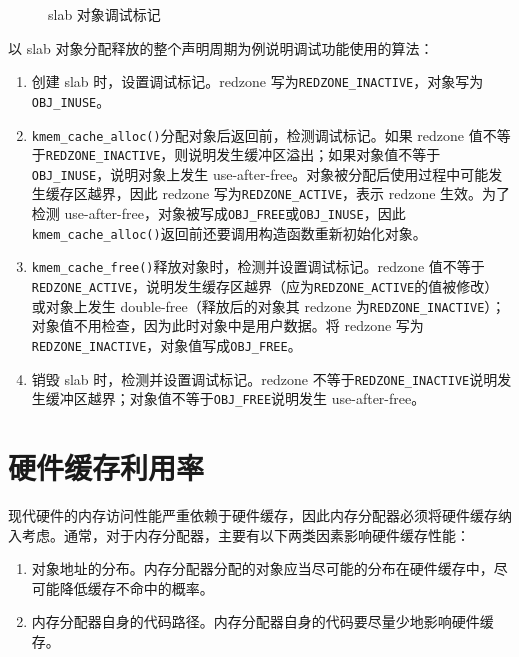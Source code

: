 \documentclass[AutoFakeBold]{LZUThesis}
\begin{document}
\begin{sloppypar}
\begin{figure}
\centering

\caption{slab 对象调试标记}
\label{figure:slab-obj-debug-mark}
\end{figure}

以 slab 对象分配释放的整个声明周期为例说明调试功能使用的算法：

\begin{enumerate}
\def\labelenumi{\arabic{enumi}.}
\item
  创建 slab 时，设置调试标记。redzone
  写为\texttt{REDZONE\_INACTIVE}，对象写为\texttt{OBJ\_INUSE}。
\item
  \texttt{kmem\_cache\_alloc()}分配对象后返回前，检测调试标记。如果
  redzone
  值不等于\texttt{REDZONE\_INACTIVE}，则说明发生缓冲区溢出；如果对象值不等于\texttt{OBJ\_INUSE}，说明对象上发生
  use-after-free。对象被分配后使用过程中可能发生缓存区越界，因此 redzone
  写为\texttt{REDZONE\_ACTIVE}，表示 redzone 生效。为了检测
  use-after-free，对象被写成\texttt{OBJ\_FREE}或\texttt{OBJ\_INUSE}，因此\texttt{kmem\_cache\_alloc()}返回前还要调用构造函数重新初始化对象。
\item
  \texttt{kmem\_cache\_free()}释放对象时，检测并设置调试标记。redzone
  值不等于\texttt{REDZONE\_ACTIVE}，说明发生缓存区越界（应为\texttt{REDZONE\_ACTIVE}的值被修改）或对象上发生
  double-free（释放后的对象其 redzone
  为\texttt{REDZONE\_INACTIVE}）；对象值不用检查，因为此时对象中是用户数据。将
  redzone 写为\texttt{REDZONE\_INACTIVE}，对象值写成\texttt{OBJ\_FREE}。
\item
  销毁 slab 时，检测并设置调试标记。redzone
  不等于\texttt{REDZONE\_INACTIVE}说明发生缓冲区越界；对象值不等于\texttt{OBJ\_FREE}说明发生
  use-after-free。
\end{enumerate}


\section{硬件缓存利用率}\label{sec:hw-cache-efficiency}

现代硬件的内存访问性能严重依赖于硬件缓存，因此内存分配器必须将硬件缓存纳入考虑。通常，对于内存分配器，主要有以下两类因素影响硬件缓存性能：

\begin{enumerate}
\def\labelenumi{\arabic{enumi}.}
\item
  对象地址的分布。内存分配器分配的对象应当尽可能的分布在硬件缓存中，尽可能降低缓存不命中的概率。
\item
  内存分配器自身的代码路径。内存分配器自身的代码要尽量少地影响硬件缓存。
\end{enumerate}


\end{sloppypar}
\end{document}
